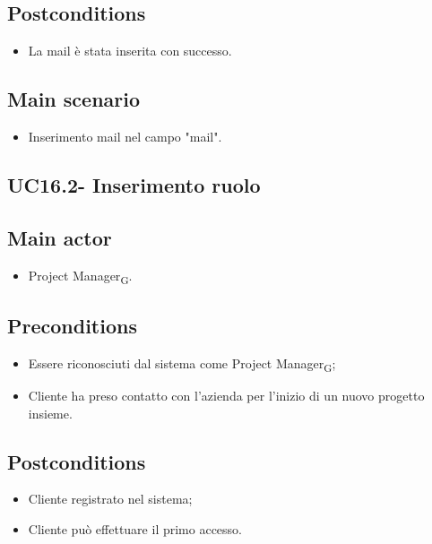 \documentclass{article}
\begin{document}
    \subsection*{Postconditions}
        \begin{itemize}
            \item La mail è stata inserita con successo.
        \end{itemize}

    \subsection*{Main scenario}
        \begin{itemize}
            \item Inserimento mail nel campo "mail".
        \end{itemize}
        

    \subsection{UC16.2- Inserimento ruolo}
    \subsection*{Main actor}
        \begin{itemize}
            \item Project Manager\textsubscript{G}.
        \end{itemize}
        
    \subsection*{Preconditions}
        \begin{itemize}
            \item Essere riconosciuti dal sistema come Project Manager\textsubscript{G};
            \item Cliente ha preso contatto con l'azienda per l'inizio di un nuovo progetto insieme.
        \end{itemize}
        
    \subsection*{Postconditions}
        \begin{itemize}
            \item Cliente registrato nel sistema;
            \item Cliente può effettuare il primo accesso.
        \end{itemize}
\end{document}
